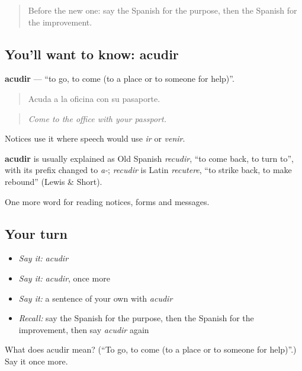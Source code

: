 \label{lesson:ES-C483-acudir}



\begin{quote}
Before the new one: say the Spanish for the purpose, then the Spanish for the improvement.
\end{quote}

\subsection*{You'll want to know: acudir}
\textbf{acudir} — \textquotedblleft{}to go, to come (to a place or to someone for help)\textquotedblright{}.

\begin{quote}
Acuda a la oficina con su pasaporte.
\end{quote}

\begin{quote}
\emph{Come to the office with your passport.}
\end{quote}

Notices use it where speech would use \emph{ir} or \emph{venir}.

\begin{cousinweb}
\textbf{acudir} is usually explained as Old Spanish \emph{recudir}, \textquotedblleft{}to come back, to turn to\textquotedblright{}, with its prefix changed to \emph{a-}; \emph{recudir} is Latin \emph{recutere}, \textquotedblleft{}to strike back, to make rebound\textquotedblright{} (Lewis \& Short).
\end{cousinweb}

\begin{grammarlens}[title={What you've built}]
One more word for reading notices, forms and messages.
\end{grammarlens}

\subsection*{Your turn}
\begin{itemize}
\raggedright
  \item \emph{Say it:} \emph{acudir}
  \item \emph{Say it:} \emph{acudir}, once more
  \item \emph{Say it:} a sentence of your own with \emph{acudir}
  \item \emph{Recall:} say the Spanish for the purpose, then the Spanish for the improvement, then say \emph{acudir} again
\end{itemize}

\begin{tcolorbox}[breakable,colback=teal!4,colframe=teal!35!black,title={Before you move on}]
What does acudir mean? (\textquotedblleft{}To go, to come (to a place or to someone for help)\textquotedblright{}.) Say it once more.
\end{tcolorbox}

